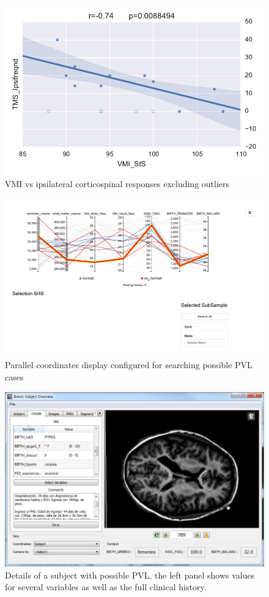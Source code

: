 \documentclass{frontiersHLTH}
\begin{document}
\begin{figure}
	\centering
		\includegraphics[width=0.9\linewidth]{corr_cyril_2}
	\caption{VMI vs ipsilateral corticospinal responses excluding outliers}
	\label{fig_cyril_5}
\end{figure}

\begin{figure}
\begin{center}
\includegraphics[width=\linewidth,trim = 30mm 90mm 60mm 10mm ,clip]{parallel_coordinates_raw}
\end{center}
 \caption{\label{fig_parallel}Parallel coordinates display configured for searching possible PVL cases}
\end{figure}


\begin{figure}
\begin{center}
\includegraphics[width=\linewidth]{pvl_details}
\end{center}
 \caption{\label{fig_subject3}Details of a subject with possible PVL, the left panel shows values for several variables as well as the full clinical history.}
\end{figure}
\end{document}
